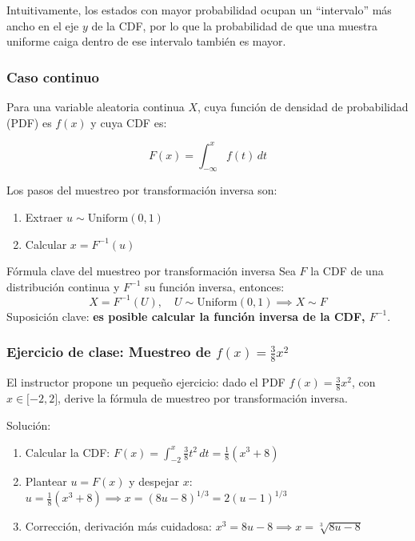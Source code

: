 \documentclass[a4paper]{article}
\begin{document}
Intuitivamente, los estados con mayor probabilidad ocupan un ``intervalo'' más ancho en el eje $y$ de la CDF, por lo que la probabilidad de que una muestra uniforme caiga dentro de ese intervalo también es mayor.

\subsubsection{Caso continuo}

Para una variable aleatoria continua $X$, cuya función de densidad de probabilidad (PDF) es $f(x)$ y cuya CDF es:

$$F(x) = \int_{-\infty}^{x} f(t) \, dt$$

Los pasos del muestreo por transformación inversa son:

\begin{enumerate}
    \item Extraer $u \sim \text{Uniform}(0, 1)$
    \item Calcular $x = F^{-1}(u)$
\end{enumerate}

\begin{importantbox}{Fórmula clave del muestreo por transformación inversa}
Sea $F$ la CDF de una distribución continua y $F^{-1}$ su función inversa, entonces:
$$X = F^{-1}(U), \quad U \sim \text{Uniform}(0,1) \implies X \sim F$$
Suposición clave: \textbf{es posible calcular la función inversa de la CDF, $F^{-1}$}.
\end{importantbox}

\subsubsection{Ejercicio de clase: Muestreo de $f(x) = \frac{3}{8}x^2$}

El instructor propone un pequeño ejercicio: dado el PDF $f(x) = \frac{3}{8}x^2$, con $x \in {[}-2, 2{]}$, derive la fórmula de muestreo por transformación inversa.

Solución:
\begin{enumerate}
    \item Calcular la CDF: $F(x) = \int_{-2}^{x} \frac{3}{8}t^2 \, dt = \frac{1}{8}(x^3 + 8)$
    \item Plantear $u = F(x)$ y despejar $x$: $u = \frac{1}{8}(x^3 + 8) \implies x = (8u - 8)^{1/3} = 2(u-1)^{1/3}$
    \item Corrección, derivación más cuidadosa: $x^3 = 8u - 8 \implies x = \sqrt[3]{8u - 8}$
\end{enumerate}
\end{document}
